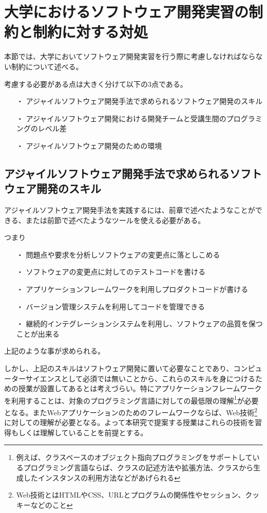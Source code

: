 \section{大学におけるソフトウェア開発実習の制約と制約に対する対処}

本節では、大学においてソフトウェア開発実習を行う際に考慮しなければならない制約について述べる。

考慮する必要がある点は大きく分けて以下の3点である。

\begin{itemize}
\item[・] アジャイルソフトウェア開発手法で求められるソフトウェア開発のスキル
\item[・] アジャイルソフトウェア開発における開発チームと受講生間のプログラミングのレベル差
\item[・] アジャイルソフトウェア開発のための環境
\end{itemize}

\subsection{アジャイルソフトウェア開発手法で求められるソフトウェア開発のスキル}

アジャイルソフトウェア開発手法を実践するには、前章で述べたようなことができる、または前節で述べたようなツールを使える必要がある。

つまり

\begin{itemize}
\item[・]問題点や要求を分析しソフトウェアの変更点に落としこめる
\item[・]ソフトウェアの変更点に対してのテストコードを書ける
\item[・]アプリケーションフレームワークを利用しプロダクトコードが書ける
\item[・]バージョン管理システムを利用してコードを管理できる
\item[・]継続的インテグレーションシステムを利用し、ソフトウェアの品質を保つことが出来る
\end{itemize}

上記のような事が求められる。

しかし、上記のスキルはソフトウェア開発に置いて必要なことであり、コンピューターサイエンスとして必須では無いことから、これらのスキルを身につけるための授業が設置してあるとは考えづらい。特にアプリケーションフレームワークを利用することは、対象のプログラミング言語に対しての最低限の理解\footnote{例えば、クラスベースのオブジェクト指向プログラミングをサポートしているプログラミング言語ならば、クラスの記述方法や拡張方法、クラスから生成したインスタンスの利用方法などがあげられる}が必要となる。またWebアプリケーションのためのフレームワークならば、Web技術\footnote{Web技術とはHTMLやCSS、URLとプログラムの関係性やセッション、クッキーなどのこと}に対しての理解が必要となる。よって本研究で提案する授業はこれらの技術を習得もしくは理解していることを前提とする。


